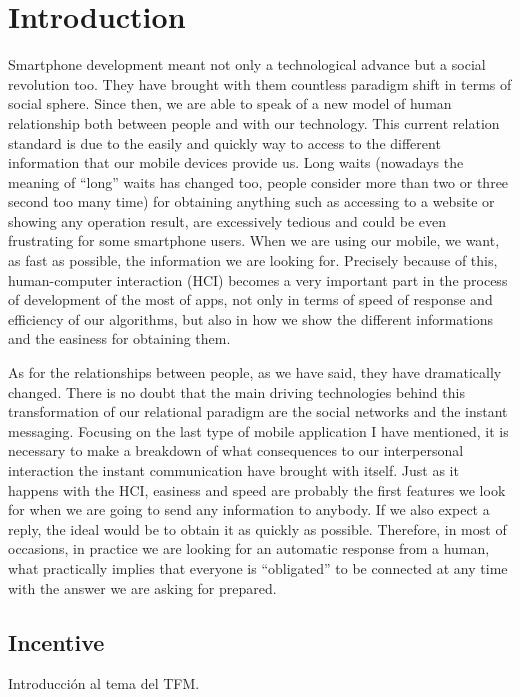 \chapter{Introduction}
\label{cap:introduccion}


Smartphone development meant not only a technological advance but a social revolution too. They have brought with them countless paradigm shift in terms of social sphere. Since then, we are able to speak of a new model of human relationship both between people and with our technology. This current relation standard is due to the easily and quickly way to access to the different information that our mobile devices provide us. Long waits (nowadays the meaning of ``long'' waits has changed too, people consider more than two or three second too many time) for obtaining anything such as accessing to a website or showing any operation result, are excessively tedious and could be even frustrating for some smartphone users. When we are using our mobile, we want, as fast as possible, the information we are looking for. Precisely because of this, human-computer interaction (HCI) becomes a very important part in the process of development of the most of apps, not only in terms of speed of response and efficiency of our algorithms, but also in how we show the different informations and the easiness for obtaining them.

As for the relationships between people, as we have said, they have dramatically changed. There is no doubt that the main driving technologies behind this transformation of our relational paradigm are the social networks and the instant messaging. Focusing on the last type of mobile application I have mentioned, it is necessary to make a breakdown of what consequences to our interpersonal interaction the instant communication have brought with itself. Just as it happens with the HCI, easiness and speed are probably the first features we look for when we are going to send any information to anybody. If we also expect a reply, the ideal would be to obtain it as quickly as possible. Therefore, in most of occasions, in practice we are looking for an automatic response from a human, what practically implies that everyone is ``obligated'' to be connected at any time with the answer we are asking for prepared.


\section{Incentive}
Introducción al tema del TFM.


